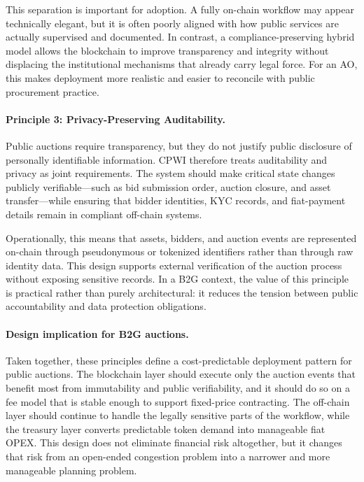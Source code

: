 \documentclass[runningheads]{llncs}
\begin{document}
This separation is important for adoption. A fully on-chain workflow may appear
technically elegant, but it is often poorly aligned with how public services are
actually supervised and documented. In contrast, a compliance-preserving hybrid
model allows the blockchain to improve transparency and integrity without
displacing the institutional mechanisms that already carry legal force. For an
AO, this makes deployment more realistic and easier to reconcile with public
procurement practice.

\paragraph{Principle 3: Privacy-Preserving Auditability.}
Public auctions require transparency, but they do not justify public disclosure of
personally identifiable information. CPWI therefore treats auditability and
privacy as joint requirements. The system should make critical state changes
publicly verifiable---such as bid submission order, auction closure, and asset
transfer---while ensuring that bidder identities, KYC records, and fiat-payment
details remain in compliant off-chain systems.

Operationally, this means that assets, bidders, and auction events are represented
on-chain through pseudonymous or tokenized identifiers rather than through raw
identity data. This design supports external verification of the auction process
without exposing sensitive records. In a B2G context, the value of this principle
is practical rather than purely architectural: it reduces the tension between
public accountability and data protection obligations.

\paragraph{Design implication for B2G auctions.}
Taken together, these principles define a cost-predictable deployment pattern for
public auctions. The blockchain layer should execute only the auction events that
benefit most from immutability and public verifiability, and it should do so on a
fee model that is stable enough to support fixed-price contracting. The off-chain
layer should continue to handle the legally sensitive parts of the workflow, while
the treasury layer converts predictable token demand into manageable fiat OPEX.
This design does not eliminate financial risk altogether, but it changes that risk
from an open-ended congestion problem into a narrower and more manageable
planning problem.
\end{document}
